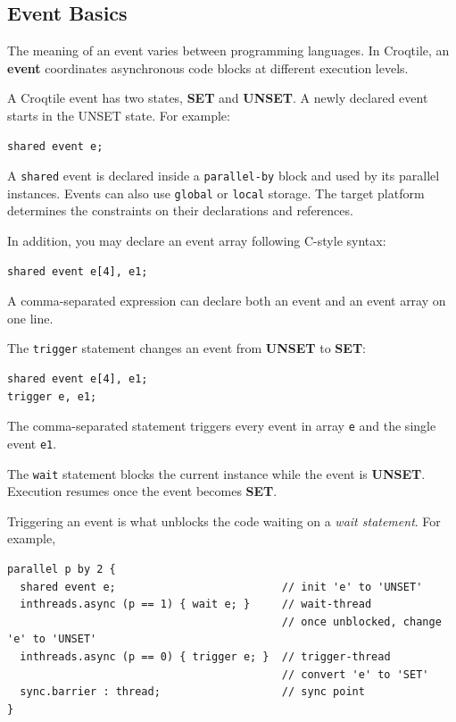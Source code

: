 \subsection*{Event Basics}

The meaning of an event varies between programming languages. In Croqtile, an \textbf{event} coordinates asynchronous code blocks at different execution levels.

A Croqtile event has two states, \textbf{SET} and \textbf{UNSET}. A newly declared event starts in the UNSET state. For example:

\begin{lstlisting}[language=croqtile,caption={Declaring a shared event}]
shared event e;
\end{lstlisting}

A \texttt{shared} event is declared inside a \texttt{parallel-by} block and used by its parallel instances. Events can also use \texttt{global} or \texttt{local} storage. The target platform determines the constraints on their declarations and references.

In addition, you may declare an event array following C-style syntax:

\begin{lstlisting}[language=croqtile,caption={Declaring an event array}]
shared event e[4], e1;
\end{lstlisting}

A comma-separated expression can declare both an event and an event array on one line.

The \texttt{trigger} statement changes an event from \textbf{UNSET} to \textbf{SET}:

\begin{lstlisting}[language=croqtile,caption={Triggering an event array}]
shared event e[4], e1;
trigger e, e1;
\end{lstlisting}

The comma-separated statement triggers every event in array \texttt{e} and the single event \texttt{e1}.

The \texttt{wait} statement blocks the current instance while the event is \textbf{UNSET}. Execution resumes once the event becomes \textbf{SET}.

Triggering an event is what unblocks the code waiting on a \emph{wait statement}. For example,

\begin{lstlisting}[language=croqtile,caption={Waiting on an event}]
parallel p by 2 {
  shared event e;                          // init 'e' to 'UNSET'
  inthreads.async (p == 1) { wait e; }     // wait-thread
                                           // once unblocked, change 'e' to 'UNSET'
  inthreads.async (p == 0) { trigger e; }  // trigger-thread
                                           // convert 'e' to 'SET'
  sync.barrier : thread;                   // sync point
}
\end{lstlisting}

